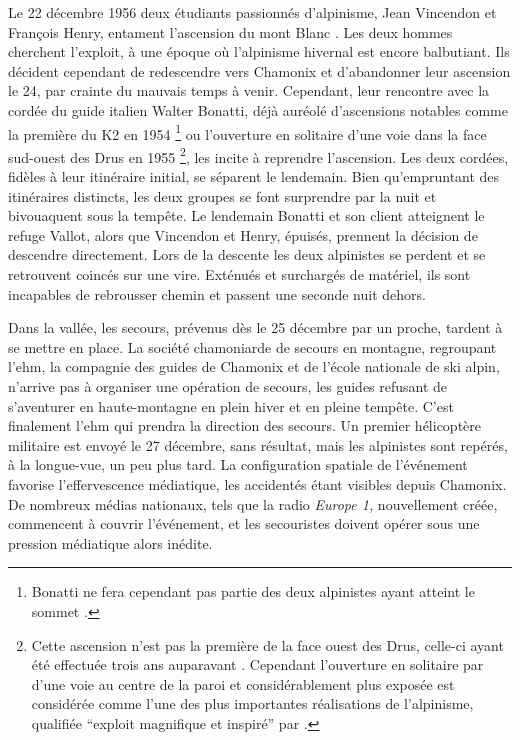 Le 22 décembre 1956 deux étudiants passionnés d'alpinisme, Jean
Vincendon et François Henry, entament l’ascension du mont Blanc
\autocite{Ballu1997}. Les deux hommes cherchent l'exploit, à une
époque où l'alpinisme hivernal est encore balbutiant. Ils décident
cependant de redescendre vers Chamonix et d'abandonner leur ascension
le 24, par crainte du mauvais temps à venir. Cependant, leur rencontre
avec la cordée du guide italien Walter Bonatti, déjà auréolé
d'ascensions notables comme la première du K2 en 1954
\footnote{Bonatti ne fera cependant pas partie des deux alpinistes
  ayant atteint le sommet \autocite{ContributeursWikipedia2020a}.} ou
l'ouverture en solitaire d'une voie dans la face sud-ouest des Drus en
1955 \footnote{Cette ascension n'est pas la première de la face ouest
  des Drus, celle-ci ayant été effectuée trois ans auparavant
  \autocite{ContributeursWikipedia2020}. Cependant l'ouverture en
  solitaire par  d'une voie au centre de la paroi et
  considérablement plus exposée est considérée comme l'une des plus
  importantes réalisations de l'alpinisme, qualifiée
  \enquote{exploit magnifique et inspiré} par
  \textcite{Robbins2000}.}, les incite à reprendre l’ascension. Les
deux cordées, fidèles à leur itinéraire initial, se séparent le
lendemain. Bien qu'empruntant des itinéraires distincts, les deux
groupes se font surprendre par la nuit et bivouaquent sous la
tempête. Le lendemain Bonatti et son client atteignent le refuge
Vallot, alors que Vincendon et Henry, épuisés, prennent la décision de
descendre directement. Lors de la descente les deux alpinistes se
perdent et se retrouvent coincés sur une \gls{vire}. Exténués et
surchargés de matériel, ils sont incapables de rebrousser chemin et
passent une seconde nuit dehors.

Dans la vallée, les secours, prévenus dès le 25 décembre par un
proche, tardent à se mettre en place. La société chamoniarde de
secours en montagne, regroupant l'\ac{ehm}, la compagnie des guides de
Chamonix et de l'école nationale de ski alpin, n'arrive pas à
organiser une opération de secours, les guides refusant de s'aventurer
en haute-montagne en plein hiver et en pleine tempête. C'est
finalement l'\ac{ehm} qui prendra la direction des secours. Un premier
hélicoptère militaire est envoyé le 27 décembre, sans résultat, mais
les alpinistes sont repérés, à la longue-vue, un peu plus tard. La
configuration spatiale de l'événement favorise l'effervescence
médiatique, les accidentés étant visibles depuis Chamonix. De nombreux
médias nationaux, tels que la radio \emph{Europe 1,} nouvellement
créée, commencent à couvrir l'événement, et les secouristes doivent
opérer sous une pression médiatique alors inédite.


